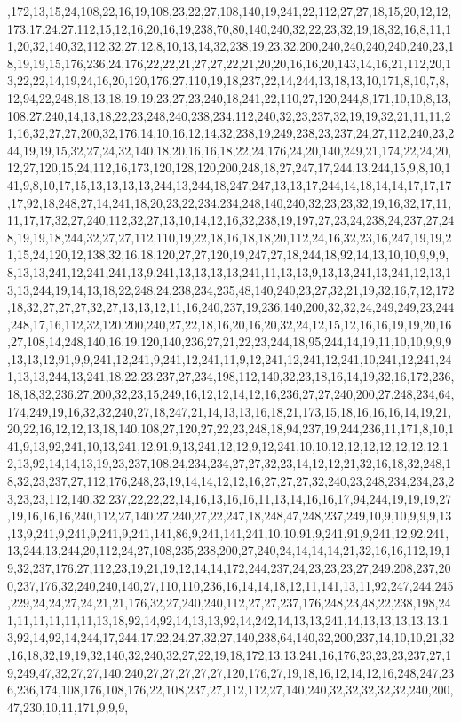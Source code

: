 ,172,13,15,24,108,22,16,19,108,23,22,27,108,140,19,241,22,112,27,27,18,15,20,12,12,173,17,24,27,112,15,12,16,20,16,19,238,70,80,140,240,32,22,23,32,19,18,32,16,8,11,11,20,32,140,32,112,32,27,12,8,10,13,14,32,238,19,23,32,200,240,240,240,240,240,23,18,19,19,15,176,236,24,176,22,22,21,27,27,22,21,20,20,16,16,20,143,14,16,21,112,20,13,22,22,14,19,24,16,20,120,176,27,110,19,18,237,22,14,244,13,18,13,10,171,8,10,7,8,12,94,22,248,18,13,18,19,19,23,27,23,240,18,241,22,110,27,120,244,8,171,10,10,8,13,108,27,240,14,13,18,22,23,248,240,238,234,112,240,32,23,237,32,19,19,32,21,11,11,21,16,32,27,27,200,32,176,14,10,16,12,14,32,238,19,249,238,23,237,24,27,112,240,23,244,19,19,15,32,27,24,32,140,18,20,16,16,18,22,24,176,24,20,140,249,21,174,22,24,20,12,27,120,15,24,112,16,173,120,128,120,200,248,18,27,247,17,244,13,244,15,9,8,10,141,9,8,10,17,15,13,13,13,13,244,13,244,18,247,247,13,13,17,244,14,18,14,14,17,17,17,17,92,18,248,27,14,241,18,20,23,22,234,234,248,140,240,32,23,23,32,19,16,32,17,11,11,17,17,32,27,240,112,32,27,13,10,14,12,16,32,238,19,197,27,23,24,238,24,237,27,248,19,19,18,244,32,27,27,112,110,19,22,18,16,18,18,20,112,24,16,32,23,16,247,19,19,21,15,24,120,12,138,32,16,18,120,27,27,120,19,247,27,18,244,18,92,14,13,10,10,9,9,9,8,13,13,241,12,241,241,13,9,241,13,13,13,13,241,11,13,13,9,13,13,241,13,241,12,13,13,13,244,19,14,13,18,22,248,24,238,234,235,48,140,240,23,27,32,21,19,32,16,7,12,172,18,32,27,27,27,32,27,13,13,12,11,16,240,237,19,236,140,200,32,32,24,249,249,23,244,248,17,16,112,32,120,200,240,27,22,18,16,20,16,20,32,24,12,15,12,16,16,19,19,20,16,27,108,14,248,140,16,19,120,140,236,27,21,22,23,244,18,95,244,14,19,11,10,10,9,9,9,13,13,12,91,9,9,241,12,241,9,241,12,241,11,9,12,241,12,241,12,241,10,241,12,241,241,13,13,244,13,241,18,22,23,237,27,234,198,112,140,32,23,18,16,14,19,32,16,172,236,18,18,32,236,27,200,32,23,15,249,16,12,12,14,12,16,236,27,27,240,200,27,248,234,64,174,249,19,16,32,32,240,27,18,247,21,14,13,13,16,18,21,173,15,18,16,16,16,14,19,21,20,22,16,12,12,13,18,140,108,27,120,27,22,23,248,18,94,237,19,244,236,11,171,8,10,141,9,13,92,241,10,13,241,12,91,9,13,241,12,12,9,12,241,10,10,12,12,12,12,12,12,12,12,13,92,14,14,13,19,23,237,108,24,234,234,27,27,32,23,14,12,12,21,32,16,18,32,248,18,32,23,237,27,112,176,248,23,19,14,14,12,12,16,27,27,27,32,240,23,248,234,234,23,23,23,23,112,140,32,237,22,22,22,14,16,13,16,16,11,13,14,16,16,17,94,244,19,19,19,27,19,16,16,16,240,112,27,140,27,240,27,22,247,18,248,47,248,237,249,10,9,10,9,9,9,13,13,9,241,9,241,9,241,9,241,141,86,9,241,141,241,10,10,91,9,241,91,9,241,12,92,241,13,244,13,244,20,112,24,27,108,235,238,200,27,240,24,14,14,14,21,32,16,16,112,19,19,32,237,176,27,112,23,19,21,19,12,14,14,172,244,237,24,23,23,23,27,249,208,237,200,237,176,32,240,240,140,27,110,110,236,16,14,14,18,12,11,141,13,11,92,247,244,245,229,24,24,27,24,21,21,176,32,27,240,240,112,27,27,237,176,248,23,48,22,238,198,241,11,11,11,11,11,13,18,92,14,92,14,13,13,92,14,242,14,13,13,241,14,13,13,13,13,13,13,92,14,92,14,244,17,244,17,22,24,27,32,27,140,238,64,140,32,200,237,14,10,10,21,32,16,18,32,19,19,32,140,32,240,32,27,22,19,18,172,13,13,241,16,176,23,23,23,237,27,19,249,47,32,27,27,140,240,27,27,27,27,27,120,176,27,19,18,16,12,14,12,16,248,247,236,236,174,108,176,108,176,22,108,237,27,112,112,27,140,240,32,32,32,32,32,240,200,47,230,10,11,171,9,9,9,